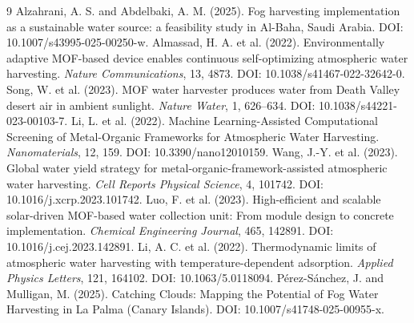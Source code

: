 \documentclass[11pt,a4paper]{article}
\begin{document}
\begin{thebibliography}{9}
 Alzahrani, A. S. and Abdelbaki, A. M. (2025). Fog harvesting implementation as a sustainable water source: a feasibility study in Al-Baha, Saudi Arabia. DOI: 10.1007/s43995-025-00250-w.
 Almassad, H. A. et al. (2022). Environmentally adaptive MOF-based device enables continuous self-optimizing atmospheric water harvesting. \emph{Nature Communications}, 13, 4873. DOI: 10.1038/s41467-022-32642-0.
 Song, W. et al. (2023). MOF water harvester produces water from Death Valley desert air in ambient sunlight. \emph{Nature Water}, 1, 626--634. DOI: 10.1038/s44221-023-00103-7.
 Li, L. et al. (2022). Machine Learning-Assisted Computational Screening of Metal-Organic Frameworks for Atmospheric Water Harvesting. \emph{Nanomaterials}, 12, 159. DOI: 10.3390/nano12010159.
 Wang, J.-Y. et al. (2023). Global water yield strategy for metal-organic-framework-assisted atmospheric water harvesting. \emph{Cell Reports Physical Science}, 4, 101742. DOI: 10.1016/j.xcrp.2023.101742.
 Luo, F. et al. (2023). High-efficient and scalable solar-driven MOF-based water collection unit: From module design to concrete implementation. \emph{Chemical Engineering Journal}, 465, 142891. DOI: 10.1016/j.cej.2023.142891.
 Li, A. C. et al. (2022). Thermodynamic limits of atmospheric water harvesting with temperature-dependent adsorption. \emph{Applied Physics Letters}, 121, 164102. DOI: 10.1063/5.0118094.
 P\'erez-S\'anchez, J. and Mulligan, M. (2025). Catching Clouds: Mapping the Potential of Fog Water Harvesting in La Palma (Canary Islands). DOI: 10.1007/s41748-025-00955-x.
\end{thebibliography}
\end{document}
